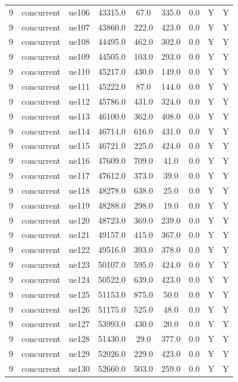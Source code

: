 \begin{table}[ht]
\begin{tabular}{|c|c|c|c|c|c|c|c|c|}
9 & concurrent & ue106 & 43315.0 & 67.0 & 335.0 & 0.0 & Y & Y \\
9 & concurrent & ue107 & 43860.0 & 222.0 & 423.0 & 0.0 & Y & Y \\
9 & concurrent & ue108 & 44495.0 & 462.0 & 302.0 & 0.0 & Y & Y \\
9 & concurrent & ue109 & 44505.0 & 103.0 & 293.0 & 0.0 & Y & Y \\
9 & concurrent & ue110 & 45217.0 & 430.0 & 149.0 & 0.0 & Y & Y \\
9 & concurrent & ue111 & 45222.0 & 87.0 & 144.0 & 0.0 & Y & Y \\
9 & concurrent & ue112 & 45786.0 & 431.0 & 324.0 & 0.0 & Y & Y \\
9 & concurrent & ue113 & 46100.0 & 362.0 & 408.0 & 0.0 & Y & Y \\
9 & concurrent & ue114 & 46714.0 & 616.0 & 431.0 & 0.0 & Y & Y \\
9 & concurrent & ue115 & 46721.0 & 225.0 & 424.0 & 0.0 & Y & Y \\
9 & concurrent & ue116 & 47609.0 & 709.0 & 41.0 & 0.0 & Y & Y \\
9 & concurrent & ue117 & 47612.0 & 373.0 & 39.0 & 0.0 & Y & Y \\
9 & concurrent & ue118 & 48278.0 & 638.0 & 25.0 & 0.0 & Y & Y \\
9 & concurrent & ue119 & 48288.0 & 298.0 & 19.0 & 0.0 & Y & Y \\
9 & concurrent & ue120 & 48723.0 & 369.0 & 239.0 & 0.0 & Y & Y \\
9 & concurrent & ue121 & 49157.0 & 415.0 & 367.0 & 0.0 & Y & Y \\
9 & concurrent & ue122 & 49516.0 & 393.0 & 378.0 & 0.0 & Y & Y \\
9 & concurrent & ue123 & 50107.0 & 595.0 & 424.0 & 0.0 & Y & Y \\
9 & concurrent & ue124 & 50522.0 & 639.0 & 423.0 & 0.0 & Y & Y \\
9 & concurrent & ue125 & 51153.0 & 875.0 & 50.0 & 0.0 & Y & Y \\
9 & concurrent & ue126 & 51175.0 & 525.0 & 48.0 & 0.0 & Y & Y \\
9 & concurrent & ue127 & 53993.0 & 430.0 & 20.0 & 0.0 & Y & Y \\
9 & concurrent & ue128 & 51430.0 & 29.0 & 377.0 & 0.0 & Y & Y \\
9 & concurrent & ue129 & 52026.0 & 229.0 & 423.0 & 0.0 & Y & Y \\
9 & concurrent & ue130 & 52660.0 & 503.0 & 259.0 & 0.0 & Y & Y \\

\end{tabular}
\end{table}
